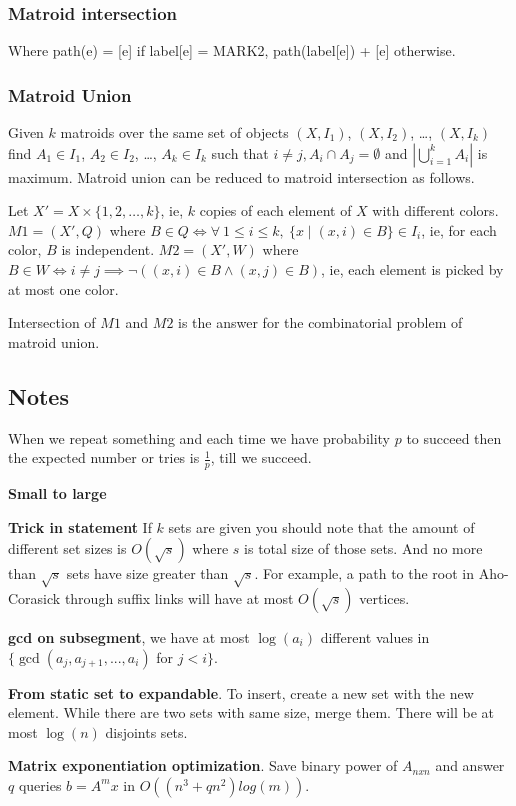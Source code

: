 \documentclass[a4paper,10pt,oneside]{article}
\newcommand\includess[2]{
   \subsubsection{#1}
   
}
\begin{document}
\begin{multicols}{2}
\includess{Matroid intersection}{code/matroid.cpp}

Where path(e) = [e] if label[e] = MARK2, path(label[e]) + [e] otherwise.

\subsubsection{Matroid Union}
Given $k$ matroids over the same set of objects $(X, I_1)$, $(X, I_2)$, \dots, $(X, I_k)$ find $A_1 \in I_1$, $A_2 \in I_2$, \dots, $A_k \in I_k$ such that $i \not= j, A_i \cap A_j = \emptyset$ and $|\bigcup\limits_{i=1}^{k} A_i|$ is maximum. Matroid union can be reduced to matroid intersection as follows.

Let $X' = X \times \{1, 2, \dots, k\}$, ie, $k$ copies of each element of $X$ with different colors. $M1 = (X', Q)$ where $B \in Q \iff \forall ~1 \le i \le k, ~\{x\mid (x, i) \in B\} \in I_i$, ie, for each color, $B$ is independent. $M2 = (X', W)$ where $B \in W \iff i \not= j \implies \lnot((x, i) \in B \land (x, j) \in B)$, ie, each element is picked by at most one color.

Intersection of $M1$ and $M2$ is the answer for the combinatorial problem of matroid union.

\subsection{Notes}
When we repeat something and each time we have probability $p$ to succeed then the expected number or tries is $\frac{1}{p}$, till we succeed.

\textbf{Small to large}

\textbf{Trick in statement} If $k$ sets are given you should note that the amount of different set sizes is $O(\sqrt{s})$ where $s$ is total size of those sets. And no more than $\sqrt{s}$ sets have size greater than $\sqrt{s}$. For example, a path to the root in Aho-Corasick through suffix links will have at most $O(\sqrt{s})$ vertices.

\textbf{gcd on subsegment}, we have at most $\log(a_i)$ different values in $\{\gcd(a_j, a_{j+1}, ..., a_i)$ for $j < i\}$.

\textbf{From static set to expandable}. To insert, create a new set with the new element. While there are two sets with same size, merge them. There will be at most $\log(n)$ disjoints sets.

\textbf{Matrix exponentiation optimization}. Save binary power of $A_{nxn}$ and answer $q$ queries $b = A^mx$ in $O((n^3 + qn^2)log(m))$.


\end{multicols}
\end{document}

